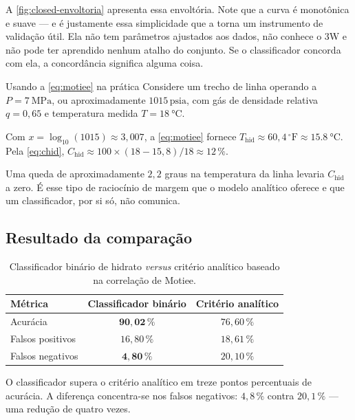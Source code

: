 A \cref{fig:closed-envoltoria} apresenta essa envoltória. Note que a curva é monotônica e
suave --- e é justamente essa simplicidade que a torna um instrumento de validação útil.
Ela não tem parâmetros ajustados aos dados, não conhece o 3W e não pode ter aprendido
nenhum atalho do conjunto. Se o classificador concorda com ela, a concordância significa
alguma coisa.

\begin{exemplo}{Usando a \cref{eq:motiee} na prática}
Considere um trecho de linha operando a $P = \SI{7}{\mega\pascal}$, ou aproximadamente
$1015\,\text{psia}$, com gás de densidade relativa $q = 0{,}65$ e temperatura medida
$T = \SI{18}{\celsius}$.

Com $x=\log_{10}(1015)\approx3{,}007$, a \cref{eq:motiee} fornece
$T_{\text{hid}}\approx60{,}4\,{}^\circ\mathrm{F}\approx\SI{15,8}{\celsius}$. Pela
\cref{eq:chid}, $C_{\text{hid}} \approx 100 \times (18 - 15{,}8)/18 \approx 12\,\%$.

Uma queda de aproximadamente $2{,}2$ graus na temperatura da linha levaria
$C_{\text{hid}}$ a zero. É esse tipo de raciocínio de margem que o modelo analítico
oferece e que um classificador, por si só, não comunica.
\end{exemplo}

\subsection{Resultado da comparação}

\begin{table}[htbp]
\centering
\caption{Classificador binário de hidrato \emph{versus} critério analítico baseado na
correlação de Motiee.}
\label{tab:closed-analitico}
\begin{tabular}{lcc}
\toprule
\textbf{Métrica} & \textbf{Classificador binário} & \textbf{Critério analítico} \\
\midrule
Acurácia            & $\bm{90{,}02\,\%}$ & $76{,}60\,\%$ \\
Falsos positivos    & $16{,}80\,\%$      & $18{,}61\,\%$ \\
Falsos negativos    & $\bm{4{,}80\,\%}$  & $20{,}10\,\%$ \\
\bottomrule
\end{tabular}
\end{table}

\begin{resultadochave}
O classificador supera o critério analítico em treze pontos percentuais de acurácia. A
diferença concentra-se nos falsos negativos: $4{,}8\,\%$ contra $20{,}1\,\%$ --- uma
redução de quatro vezes.
\end{resultadochave}

